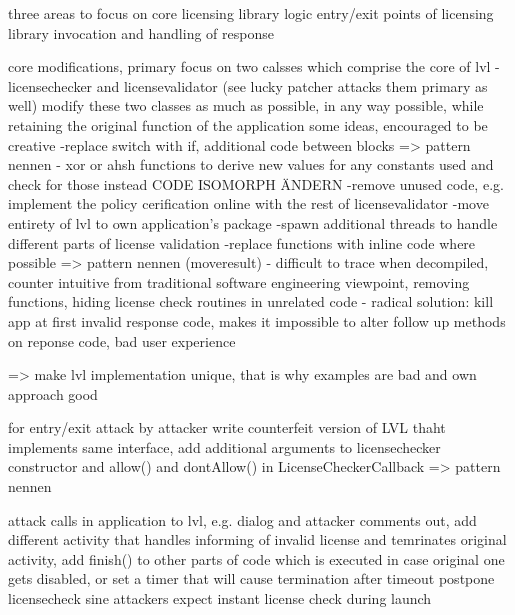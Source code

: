 three areas to focus on \cite{developersSecuring}
core licensing library logic \cite{developersSecuring}
entry/exit points of licensing library \cite{developersSecuring}
invocation and handling of response \cite{developersSecuring}

core modifications, primary focus on two calsses which comprise the core of \gls{lvl} - licensechecker and licensevalidator (see lucky patcher attacks them primary as well) \cite{developersSecuring}
modify these two classes as much as possible, in any way possible, while retaining the original function of the application \cite{developersSecuring}
some ideas, encouraged to be creative \cite{developersSecuring}
-replace switch with if, additional code between blocks => pattern nennen \cite{developersSecuring}
- xor or ahsh functions to derive new values for any constants used and check for those instead CODE ISOMORPH ÄNDERN\cite{developersSecuring}
-remove unused code, e.g. implement the policy cerification online with the rest of licensevalidator \cite{developersSecuring}
-move entirety of \gls{lvl} to own application's package \cite{developersSecuring}
-spawn additional threads to handle different parts of license validation \cite{developersSecuring}
-replace functions with inline code where possible => pattern nennen (moveresult) \cite{developersSecuring}
- difficult to trace when decompiled, counter intuitive from traditional software engineering viewpoint, removing functions, hiding license check routines in unrelated code\cite{developersSecuring}
- radical solution: kill app at first invalid response code, makes it impossible to alter follow up methods on reponse code, bad user experience

=> make lvl implementation unique, that is why examples are bad and own approach good \cite{developersSecuring}

for entry/exit \cite{developersSecuring}
attack by attacker write counterfeit version of LVL thaht implements same interface, add additional arguments to licensechecker constructor and allow() and dontAllow() in LicenseCheckerCallback => pattern nennen \cite{developersSecuring}

attack calls in application to lvl, e.g. dialog and attacker comments out, add different activity that handles informing of invalid license and temrinates original activity, add finish() to other parts of code which is executed in case original one gets disabled, or set a timer that will cause termination after timeout \cite{developersSecuring}
postpone licensecheck sine attackers expect instant license check during launch \cite{developersSecuring}


